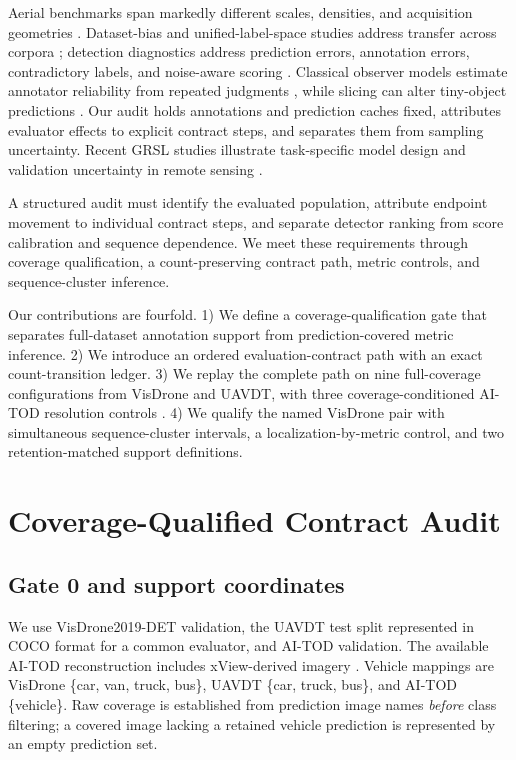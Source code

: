 \documentclass[journal]{IEEEtran}
\begin{document}
Aerial benchmarks span markedly different scales, densities, and acquisition geometries \cite{zhu2018vision,zhu2021detection,du2018unmanned,xia2018dota,ding2021object,xu2022detecting}. Dataset-bias and unified-label-space studies address transfer across corpora \cite{torralba2011unbiased,zhao2020object}; detection diagnostics address prediction errors, annotation errors, contradictory labels, and noise-aware scoring \cite{bolya2020tide,northcutt2021pervasive,schubert2024identifying,murrugarra2025noise,tschirschwitz2025label,zhu2024robust}. Classical observer models estimate annotator reliability from repeated judgments \cite{dawid1979maximum,welinder2010multidimensional}, while slicing can alter tiny-object predictions \cite{akyon2022slicing}. Our audit holds annotations and prediction caches fixed, attributes evaluator effects to explicit contract steps, and separates them from sampling uncertainty. Recent GRSL studies illustrate task-specific model design and validation uncertainty in remote sensing \cite{zhu2025unetmamba,liu2025dem}.

A structured audit must identify the evaluated population, attribute endpoint movement to individual contract steps, and separate detector ranking from score calibration and sequence dependence. We meet these requirements through coverage qualification, a count-preserving contract path, metric controls, and sequence-cluster inference.

Our contributions are fourfold. 1) We define a coverage-qualification gate that separates full-dataset annotation support from prediction-covered metric inference. 2) We introduce an ordered evaluation-contract path with an exact count-transition ledger. 3) We replay the complete path on nine full-coverage configurations from VisDrone and UAVDT, with three coverage-conditioned AI-TOD resolution controls \cite{zhu2018vision,du2018unmanned,xu2022detecting}. 4) We qualify the named VisDrone pair with simultaneous sequence-cluster intervals, a localization-by-metric control, and two retention-matched support definitions.

\section{Coverage-Qualified Contract Audit}
\subsection{Gate 0 and support coordinates}
We use VisDrone2019-DET validation, the UAVDT test split represented in COCO format for a common evaluator, and AI-TOD validation. The available AI-TOD reconstruction includes xView-derived imagery \cite{lam2018xview}. Vehicle mappings are VisDrone \{car, van, truck, bus\}, UAVDT \{car, truck, bus\}, and AI-TOD \{vehicle\}. Raw coverage is established from prediction image names \emph{before} class filtering; a covered image lacking a retained vehicle prediction is represented by an empty prediction set.
\end{document}
